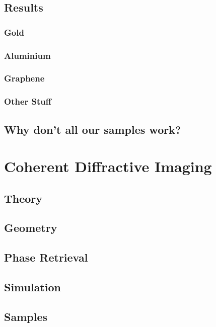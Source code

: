 \section{Results}

\subsection{Gold}

\subsection{Aluminium}

\subsection{Graphene}

\subsection{Other Stuff}

\section{Why don't all our samples work?}


\chapter{Coherent Diffractive Imaging}

\section{Theory}

\section{Geometry}

\section{Phase Retrieval}

\section{Simulation}

\section{Samples}

